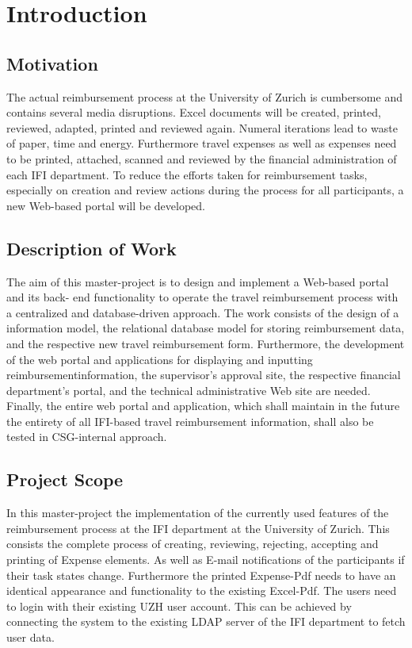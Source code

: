 \chapter{Introduction}

\section{Motivation}

The actual reimbursement process at the University of Zurich is cumbersome and contains several media disruptions. Excel documents will be created, printed, reviewed, adapted, printed and reviewed again. Numeral iterations lead to waste of paper, time and energy. Furthermore travel expenses as well as expenses need to be printed, attached, scanned and reviewed by the financial administration of each IFI \cite{ifi} department. To reduce the efforts taken for reimbursement tasks, especially on creation and review actions during the process for all participants, a new Web-based portal will be developed.

\section{Description of Work}

The aim of this master-project is to design and implement a Web-based portal and its back- end functionality to operate the travel reimbursement process with a centralized and database-driven approach. The work consists of the design of a information model, the relational database model for storing reimbursement data, and the respective new travel reimbursement form. Furthermore, the development of the web portal and applications for displaying and inputting reimbursementinformation, the supervisor’s approval site, the respective financial department’s portal, and the technical administrative Web site are needed. Finally, the entire web portal and application, which shall maintain in the future the entirety of all IFI-based travel reimbursement information, shall also be tested in CSG-internal approach.


\section{Project Scope}

In this master-project the implementation of the currently used features of the reimbursement process at the IFI \cite{ifi} department at the University of Zurich. This consists the complete process of creating, reviewing, rejecting, accepting and printing of Expense elements. As well as E-mail notifications of the participants if their task states change. Furthermore the printed Expense-Pdf needs to have an identical appearance and functionality to the existing Excel-Pdf. The users need to login with their existing UZH user account. This can be achieved by connecting the system to the existing LDAP server of the IFI department to fetch user data.  